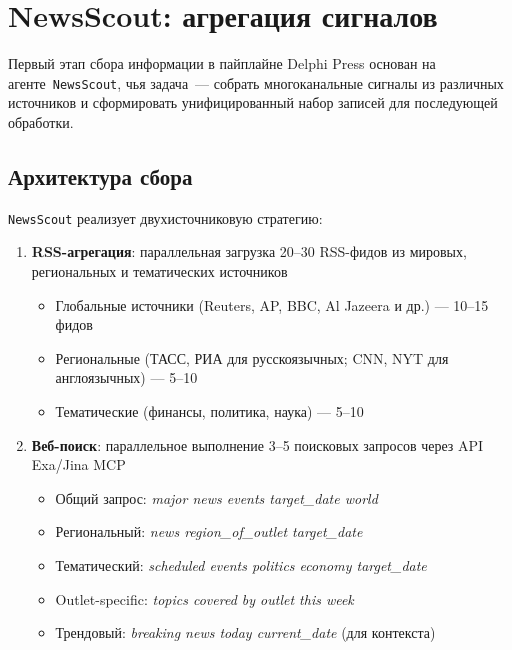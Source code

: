 
\section{NewsScout: агрегация сигналов}

Первый этап сбора информации в пайплайне Delphi Press основан на агенте~\texttt{NewsScout}, чья задача~--- собрать многоканальные сигналы из различных источников и сформировать унифицированный набор записей для последующей обработки.


\subsection{Архитектура сбора}

\texttt{NewsScout} реализует двухисточниковую стратегию:

\begin{enumerate}
    \item \textbf{RSS-агрегация}: параллельная загрузка 20--30 RSS-фидов из мировых, региональных и тематических источников
    \begin{itemize}
        \item Глобальные источники (Reuters, AP, BBC, Al Jazeera и др.) --- 10--15 фидов
        \item Региональные (ТАСС, РИА для русскоязычных; CNN, NYT для англоязычных) --- 5--10
        \item Тематические (финансы, политика, наука) --- 5--10
    \end{itemize}

    \item \textbf{Веб-поиск}: параллельное выполнение 3--5 поисковых запросов через API Exa/Jina MCP
    \begin{itemize}
        \item Общий запрос: \emph{major news events {target\_date} world}
        \item Региональный: \emph{news {region\_of\_outlet} {target\_date}}
        \item Тематический: \emph{scheduled events politics economy {target\_date}}
        \item Outlet-specific: \emph{topics covered by {outlet} this week}
        \item Трендовый: \emph{breaking news today {current\_date}} (для контекста)
    \end{itemize}
\end{enumerate}

